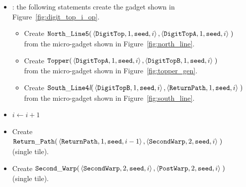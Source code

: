\begin{itemize}
    \item {\dtop}: the following statements create the gadget shown in Figure~\ref{fig:digit_top_i_op}.
    \begin{itemize}
        \item Create
        $\begin{aligned}[t]
            {\tt North\_Line5}(& \left \langle {\tt DigitTop},  1, {\tt seed}, i \right\rangle,
                                 \left \langle {\tt DigitTopA}, 1, {\tt seed}, i \right\rangle \;)
        \end{aligned}$\\ from the micro-gadget shown in Figure~\ref{fig:north_line}.

        \item Create
        $\begin{aligned}[t]
            {\tt Topper}(& \left\langle {\tt DigitTopA}, 1, {\tt seed}, i \right\rangle,
                           \left\langle {\tt DigitTopB}, 1, {\tt seed}, i \right\rangle \;)
        \end{aligned}$\\ from the micro-gadget shown in Figure~\ref{fig:topper_gen}.

        \item Create
        $\begin{aligned}[t]
            {\tt South\_Line4\textit{l}}(& \left\langle {\tt DigitTopB},  1, {\tt seed}, i\right\rangle,
                                           \left\langle {\tt ReturnPath}, 1, {\tt seed}, i\right\rangle \;)
        \end{aligned}$\\ from the micro-gadget shown in Figure~\ref{fig:south_line}.
    \end{itemize}

    \item $i \gets i + 1$

    \item Create
    $\begin{aligned}[t]
            {\tt Return\_Path}(&\left\langle {\tt ReturnPath}, 1, {\tt seed}, i - 1\right\rangle,
                         \left\langle {\tt SecondWarp}, 2, {\tt seed}, i    \right\rangle \;)
    \end{aligned}$\\ (single tile).

    \item Create
    $\begin{aligned}[t]
        {\tt Second\_Warp}(&\left\langle {\tt SecondWarp}, 2, {\tt seed}, i \right\rangle,
                     \left\langle {\tt PostWarp},   2, {\tt seed}, i \right\rangle \;)
    \end{aligned}$ (single tile).


\end{itemize}
